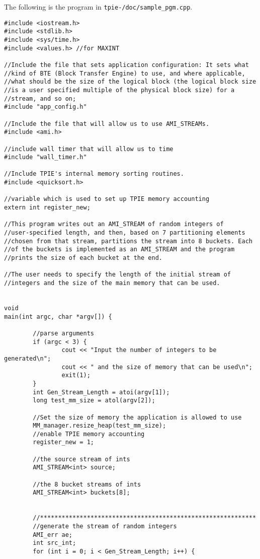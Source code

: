 The following is the program in {\tt  tpie-\version/doc/sample\_pgm.cpp}.
\begin{verbatim}
#include <iostream.h>
#include <stdlib.h>
#include <sys/time.h>
#include <values.h> //for MAXINT

//Include the file that sets application configuration: It sets what
//kind of BTE (Block Transfer Engine) to use, and where applicable,
//what should be the size of the logical block (the logical block size
//is a user specified multiple of the physical block size) for a
//stream, and so on;
#include "app_config.h"

//Include the file that will allow us to use AMI_STREAMs.
#include <ami.h>

//include wall timer that will allow us to time
#include "wall_timer.h"

//Include TPIE's internal memory sorting routines.
#include <quicksort.h>

//variable which is used to set up TPIE memory accounting
extern int register_new;

//This program writes out an AMI_STREAM of random integers of
//user-specified length, and then, based on 7 partitioning elements
//chosen from that stream, partitions the stream into 8 buckets. Each
//of the buckets is implemented as an AMI_STREAM and the program
//prints the size of each bucket at the end.

//The user needs to specify the length of the initial stream of
//integers and the size of the main memory that can be used.


void
main(int argc, char *argv[]) {
        
        //parse arguments
        if (argc < 3) {
                cout << "Input the number of integers to be generated\n";
                cout << " and the size of memory that can be used\n";
                exit(1);
        }
        int Gen_Stream_Length = atoi(argv[1]);
        long test_mm_size = atol(argv[2]);
        
        //Set the size of memory the application is allowed to use
        MM_manager.resize_heap(test_mm_size);
        //enable TPIE memory accounting
        register_new = 1;
        
        //the source stream of ints
        AMI_STREAM<int> source;

        //the 8 bucket streams of ints
        AMI_STREAM<int> buckets[8];
        
        
        //************************************************************
        //generate the stream of random integers
        AMI_err ae;
        int src_int;
        for (int i = 0; i < Gen_Stream_Length; i++) {
                

\end{verbatim}
